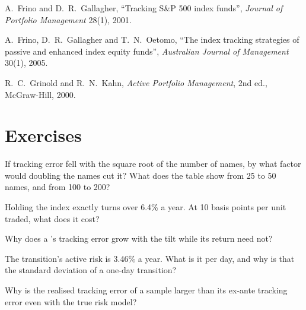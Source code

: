 \begin{omsources}
\item A.~Frino and D.~R.~Gallagher, ``Tracking S\&P 500 index funds'', \emph{Journal of Portfolio Management} 28(1), 2001.
\item A.~Frino, D.~R.~Gallagher and T.~N.~Oetomo, ``The index tracking strategies of passive and enhanced index equity funds'', \emph{Australian Journal
of Management} 30(1), 2005.
\item R.~C.~Grinold and R.~N.~Kahn, \emph{Active Portfolio Management}, 2nd ed., McGraw-Hill, 2000.
\end{omsources}

\section{Exercises}

\begin{exercise}[$\star$]\label{exo:s1:the-asset-managers-strategies:1}
If tracking error fell with the square root of the number of names, by what factor would doubling the names cut it? What does the table show from 25 to 50
names, and from 100 to 200?
\end{exercise}

\begin{exercise}[$\star$]\label{exo:s1:the-asset-managers-strategies:2}
Holding the index exactly turns over 6.4\% a year. At 10 basis points per unit traded, what does it cost?
\end{exercise}

\begin{exercise}[$\star$]\label{exo:s1:the-asset-managers-strategies:3}
Why does a 's tracking error grow with the tilt while its return need not?
\end{exercise}

\begin{exercise}[$\star\star$]\label{exo:s1:the-asset-managers-strategies:4}
The transition's active risk is 3.46\% a year. What is it per day, and why is that the standard deviation of a one-day transition?
\end{exercise}

\begin{exercise}[$\star\star$]\label{exo:s1:the-asset-managers-strategies:5}
Why is the realised tracking error of a sample larger than its ex-ante tracking error even with the true risk model?
\end{exercise}

